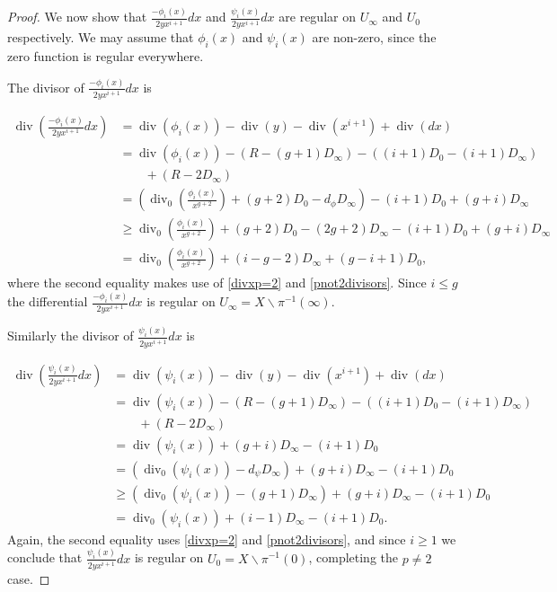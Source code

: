 \documentclass[draft, 11pt]{article} %
\theoremstyle{plain}
\theoremstyle{remark}
\DeclareMathOperator{\di}{div}
\begin{document}
\begin{proof}
We now show that $\frac{-\phi_i(x)}{2yx^{i+1}}dx$ and $\frac{\psi_i(x)}{2yx^{i+1}}dx$ are regular on $U_\infty$ and $U_0$ respectively.
We may assume that $\phi_i(x)$ and $\psi_i(x)$ are non-zero, since the zero function is regular everywhere.

\pagebreak

The divisor of $\frac{-\phi_i(x)}{2yx^{i+1}}dx$ is

\begin{align*}
\di\left( \frac{-\phi_i(x)}{2yx^{i+1}}dx \right) & =  \di(\phi_i(x)) -\di(y) - \di(x^{i+1}) + \di (dx) \\
& =  \di(\phi_i(x)) - ( R - (g+1)D_\infty) - ((i+1)D_0 - (i+1)D_\infty) \\
& \qquad + (R - 2D_\infty) \\
& =  \left( \di_0\left( \frac{\phi_i(x)}{x^{g+2}}\right) + (g+2)D_0 - d_\phi D_\infty\right) - (i+1)D_0 + (g+i)D_\infty \\
& \geq  \di_0\left( \frac{\phi_i(x)}{x^{g+2}}\right) + (g+2)D_0 - (2g+2)D_\infty - (i+1)D_0 + (g+i)D_\infty \\
& =  \di_0\left( \frac{\phi_i(x)}{x^{g+2}} \right) + (i-g-2)D_\infty + (g-i+1)D_0,
\end{align*}
where the second equality makes use of \eqref{divxp=2} and \eqref{pnot2divisors}.
Since $i \leq g$ the differential $\frac{-\phi_i(x)}{2yx^{i+1}}dx$ is regular on $U_\infty = X\backslash \pi^{-1}(\infty)$.

Similarly the divisor of $\frac{\psi_i(x)}{2yx^{i+1}}dx$ is

\begin{align*}
\di \left( \frac{\psi_i(x)}{2yx^{i+1}}dx\right) & =  \di(\psi_i(x)) - \di(y) - \di(x^{i+1}) + \di (dx) \\
& =  \di (\psi_i(x) ) -(R - (g+1)D_\infty) - ((i+1)D_0 - (i+1)D_\infty) \\ 
& \qquad + (R -2D_\infty) \\
& =  \di(\psi_i(x)) + (g+i)D_\infty -(i+1)D_0 \\
& =  (\di_0(\psi_i(x)) -d_\psi D_\infty) + (g+i)D_\infty -(i+1)D_0 \\
& \geq \left( \di_0(\psi_i(x)) - (g+1)D_\infty \right) + (g+i)D_\infty -(i+1)D_0 \\
& =  \di_0(\psi_i(x)) + (i-1)D_\infty - (i+1)D_0.
\end{align*}
Again, the second equality uses \eqref{divxp=2} and \eqref{pnot2divisors}, and since $i\geq 1$ we conclude that $\frac{\psi_i(x)}{2yx^{i+1}}dx$ is regular on $U_0 = X \backslash \pi^{-1}(0)$, completing the $p\neq 2$ case.



\end{proof}
\end{document}

